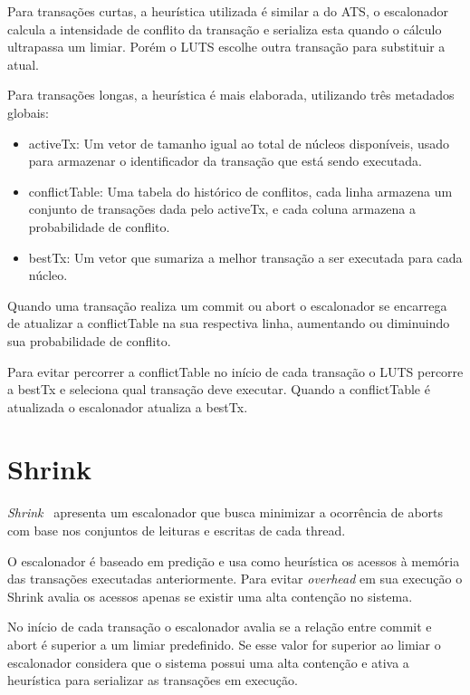 \documentclass[diss,capa]{texufpel}
\begin{document}
Para transações curtas, a heurística utilizada é similar a do ATS, o escalonador calcula a intensidade de conflito da transação e serializa esta quando o cálculo ultrapassa um limiar. Porém o LUTS escolhe outra transação para substituir a atual.

Para transações longas, a heurística é mais elaborada, utilizando três metadados globais:

\begin{itemize}
 \item  activeTx: Um vetor de tamanho igual ao total de núcleos disponíveis, usado para armazenar o identificador da transação que está sendo executada.
 \item conflictTable: Uma tabela do histórico de conflitos, cada linha armazena um conjunto de transações dada pelo activeTx, e cada coluna armazena a probabilidade de conflito.
 \item bestTx: Um vetor que sumariza a melhor transação a ser executada para cada núcleo.
\end{itemize}

Quando uma transação realiza um commit ou abort o escalonador se encarrega de atualizar a conflictTable na sua respectiva linha, aumentando ou diminuindo sua probabilidade de conflito.

Para evitar percorrer a conflictTable no início de cada transação o LUTS percorre a bestTx e seleciona qual transação deve executar. Quando a conflictTable é atualizada o escalonador atualiza a bestTx.

\section{Shrink}

\emph{Shrink}~\cite{shrink2009} apresenta um escalonador que busca minimizar a ocorrência de aborts com base nos conjuntos de leituras e escritas de cada thread.

O escalonador é baseado em predição e usa como heurística os acessos à memória das transações executadas anteriormente. Para evitar \emph{overhead} em sua execução o Shrink avalia os acessos apenas se existir uma alta contenção no sistema.

No início de cada transação o escalonador avalia se a relação entre commit e abort é superior a um limiar predefinido. Se esse valor for superior ao limiar o escalonador considera que o sistema possui uma alta contenção e ativa a heurística para serializar as transações em execução.
\end{document}
